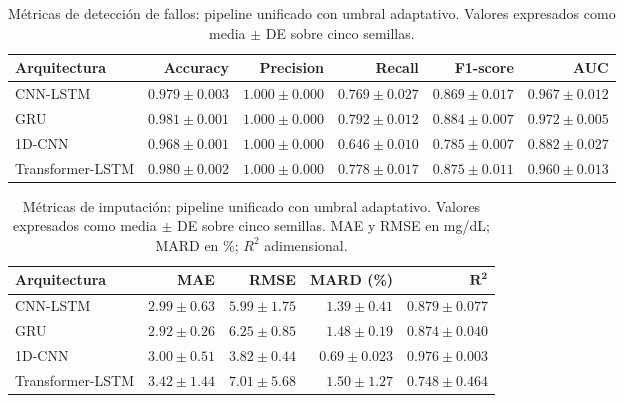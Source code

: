 \documentclass{report}
\begin{document}
\begin{table}[htbp]
\centering
\caption{Métricas de detección de fallos: pipeline unificado con umbral adaptativo.
Valores expresados como media $\pm$ DE sobre cinco semillas.}
\label{tab:bloque_b_deteccion}
\begin{tabular}{lrrrrr}
\toprule
\textbf{Arquitectura} &
\textbf{Accuracy} & \textbf{Precision} & \textbf{Recall} &
\textbf{F1-score} & \textbf{AUC} \\
\midrule
CNN-LSTM         & $0.979 \pm 0.003$ & $1.000 \pm 0.000$ & $0.769 \pm 0.027$
                 & $0.869 \pm 0.017$ & $0.967 \pm 0.012$ \\
GRU              & $0.981 \pm 0.001$ & $1.000 \pm 0.000$ & $0.792 \pm 0.012$
                 & $0.884 \pm 0.007$ & $0.972 \pm 0.005$ \\
1D-CNN           & $0.968 \pm 0.001$ & $1.000 \pm 0.000$ & $0.646 \pm 0.010$
                 & $0.785 \pm 0.007$ & $0.882 \pm 0.027$ \\
Transformer-LSTM & $0.980 \pm 0.002$ & $1.000 \pm 0.000$ & $0.778 \pm 0.017$
                 & $0.875 \pm 0.011$ & $0.960 \pm 0.013$ \\
\bottomrule
\end{tabular}
\end{table}

\begin{table}[htbp]
\centering
\caption{Métricas de imputación: pipeline unificado con umbral adaptativo. Valores expresados como media $\pm$ DE sobre cinco semillas. MAE y RMSE en mg/dL; MARD en \%; $R^2$ adimensional.}
\label{tab:bloque_b_imputacion}
\begin{tabular}{lrrrr}
\toprule
\textbf{Arquitectura} &
\textbf{MAE} & \textbf{RMSE} & \textbf{MARD (\%)} & $\boldsymbol{R^2}$ \\
\midrule
CNN-LSTM         & $2.99 \pm 0.63$ & $5.99 \pm 1.75$ & $1.39 \pm 0.41$
                 & $0.879 \pm 0.077$ \\
GRU              & $2.92 \pm 0.26$ & $6.25 \pm 0.85$ & $1.48 \pm 0.19$
                 & $0.874 \pm 0.040$ \\
1D-CNN           & $3.00 \pm 0.51$ & $3.82 \pm 0.44$ & $0.69 \pm 0.023$
                 & $0.976 \pm 0.003$ \\
Transformer-LSTM & $3.42 \pm 1.44$ & $7.01 \pm 5.68$ & $1.50 \pm 1.27$
                 & $0.748 \pm 0.464$ \\
\bottomrule
\end{tabular}
\end{table}
\end{document}
